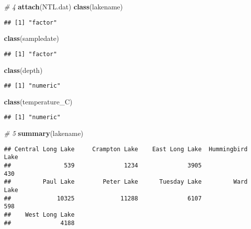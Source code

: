 \documentclass[]{article}
\newenvironment{Shaded}{\begin{snugshade}}{\end{snugshade}}
\newcommand{\KeywordTok}[1]{\textcolor[rgb]{0.13,0.29,0.53}{\textbf{#1}}}
\newcommand{\CommentTok}[1]{\textcolor[rgb]{0.56,0.35,0.01}{\textit{#1}}}
\newcommand{\NormalTok}[1]{#1}
\begin{document}
\begin{Shaded}
\begin{Highlighting}[]
\CommentTok{# 4}
\KeywordTok{attach}\NormalTok{(NTL.dat)}
\KeywordTok{class}\NormalTok{(lakename)}
\end{Highlighting}
\end{Shaded}

\begin{verbatim}
## [1] "factor"
\end{verbatim}

\begin{Shaded}
\begin{Highlighting}[]
\KeywordTok{class}\NormalTok{(sampledate)}
\end{Highlighting}
\end{Shaded}

\begin{verbatim}
## [1] "factor"
\end{verbatim}

\begin{Shaded}
\begin{Highlighting}[]
\KeywordTok{class}\NormalTok{(depth)}
\end{Highlighting}
\end{Shaded}

\begin{verbatim}
## [1] "numeric"
\end{verbatim}

\begin{Shaded}
\begin{Highlighting}[]
\KeywordTok{class}\NormalTok{(temperature_C)}
\end{Highlighting}
\end{Shaded}

\begin{verbatim}
## [1] "numeric"
\end{verbatim}

\begin{Shaded}
\begin{Highlighting}[]
\CommentTok{# 5}
\KeywordTok{summary}\NormalTok{(lakename)}
\end{Highlighting}
\end{Shaded}

\begin{verbatim}
## Central Long Lake     Crampton Lake    East Long Lake  Hummingbird Lake 
##               539              1234              3905               430 
##         Paul Lake        Peter Lake      Tuesday Lake         Ward Lake 
##             10325             11288              6107               598 
##    West Long Lake 
##              4188
\end{verbatim}
\end{document}
